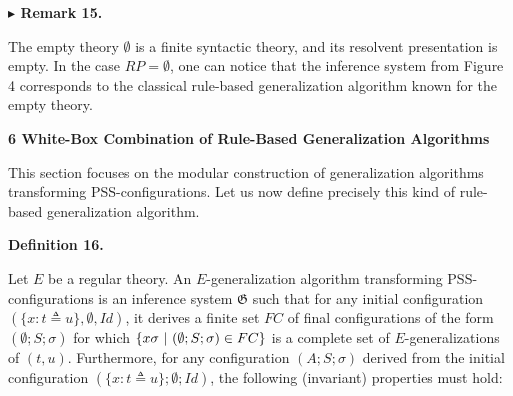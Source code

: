  
 
\par\medskip\noindent\textbf{$\blacktriangleright$ Remark 15.}\par
 
 
The empty theory $\emptyset$ is a finite syntactic theory, and its resolvent presentation is empty. In the case $RP=\emptyset$, one can notice that the inference system from Figure 4 corresponds to the classical rule-based generalization algorithm known for the empty theory.\par
 
 
 
 


 
\par\medskip\noindent\textbf{6 White-Box Combination of Rule-Based Generalization Algorithms}\par
 
 
This section focuses on the modular construction of generalization algorithms transforming PSS-configurations. Let us now define precisely this kind of rule-based generalization algorithm.\par
 
 
 
\par\medskip\noindent\textbf{Definition 16.}\par
 
 
Let $E$ be a regular theory. An $E$-generalization algorithm transforming PSS-configurations is an inference system $\mathfrak{G}$ such that for any initial configuration $(\{x:t\triangleq u\},\emptyset,\mathit{Id})$, it derives a finite set $FC$ of final configurations of the form $(\emptyset;S;\sigma)$ for which $\{x\sigma\leavevmode\nobreak\ |\leavevmode\nobreak\ (\emptyset;S;\sigma)\in FC\}$ is a complete set of $E$-generalizations of $(t,u)$. Furthermore, for any configuration $(A;S;\sigma)$ derived from the initial configuration $(\{x:t\triangleq u\};\emptyset;\mathit{Id})$, the following (invariant) properties must hold:\par
  
